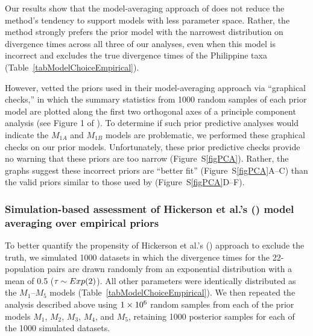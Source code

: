 Our results show that the model-averaging approach of \citet{Hickerson2013}
does not reduce the method's tendency to support models with less parameter
space.
Rather, the method strongly prefers the prior model with the narrowest
distribution on divergence times across all three of our analyses, even when
this model is incorrect and excludes the true divergence times
of the Philippine taxa (Table~\ref{tabModelChoiceEmpirical}).

However, \citet{Hickerson2013} vetted the priors used in their model-averaging
approach via ``graphical checks,'' in which the summary statistics from 1000
random samples of each prior model are plotted along the first two orthogonal
axes of a principle component analysis (see Figure 1 of \citet{Hickerson2013}).
To determine if such prior predictive analyses would indicate the $M_{1A}$ and
$M_{1B}$ models are problematic, we performed these graphical checks on our
prior models.
Unfortunately, these prior predictive checks provide no warning that these
priors are too narrow (Figure~S\ref{figPCA}).
Rather, the graphs suggest these incorrect priors are ``better fit''
(Figure~S\ref{figPCA}A--C) than the valid priors similar to those used by
\citet{Oaks2012} (Figure~S\ref{figPCA}D--F).



\subsubsection{Simulation-based assessment of Hickerson et al.'s
    (\citeyear{Hickerson2013}) model averaging over empirical priors}

To better quantify the propensity of Hickerson et al.'s
(\citeyear{Hickerson2013}) approach to exclude the truth, we simulated 1000
datasets in which the divergence times for the 22-population pairs are drawn
randomly from an exponential distribution with a mean of 0.5 ($\tau_{} \sim
Exp(2)$).
All other parameters were identically distributed as the $M_1$--$M_5$ models
(Table~\ref{tabModelChoiceEmpirical}).
We then repeated the analysis described above using $1\times 10^{6}$ random samples from
each of the prior models $M_1$, $M_2$, $M_3$, $M_4$, and $M_5$, retaining 1000
posterior samples for each of the 1000 simulated datasets.

